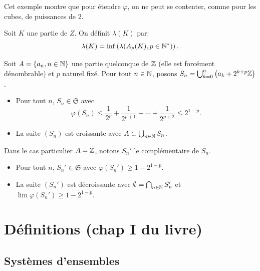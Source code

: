 Cet exemple montre que pour étendre $\varphi$, on ne peut se contenter, comme pour les cubes, de puissances de $2$.

\begin{defi}
 Soit $K$ une partie de $Z$. On définit $\lambda(K)$ par:
 \begin{displaymath}
  \lambda(K) = \inf\left( \lambda(A_p(K), p\in \mathbb{N}^*)\right).
 \end{displaymath}
\end{defi}

\begin{explen} \label{exple:SuiteUnionClassesCong}
Soit $A = \left\lbrace a_n, n \in\mathbb{N}\right\rbrace$ une partie quelconque de $\mathbb{Z}$ (elle est forcément dénombrable) et $p$ naturel fixé.\newline
Pour tout $n \in \mathbb{N}$, posons $S_n = \bigcup_{k =0}^n \left(a_k + 2^{k+p} \mathbb{Z}\right)$.
 \begin{itemize}
  \item Pour tout $n$, $S_n\in \mathfrak{S}$ avec
  \begin{displaymath}
    \varphi(S_n)\leq \frac{1}{2^p} + \frac{1}{2^{p+1}} + \cdots + \frac{1}{2^{p+2}} \leq 2^{1-p}.
  \end{displaymath}
  \item La suite $(S_n)$ est croissante avec $A \subset \bigcup_{n\in \mathbb{N}}S_n$.
 \end{itemize}
Dans le cas particulier $A=\mathbb{Z}$, notons $S_n'$ le complémentaire de $S_n$.
 \begin{itemize}
  \item Pour tout $n$, $S_n'\in \mathfrak{S}$ avec $\varphi(S_n')\geq 1- 2^{1-p}$.
  \item La suite $(S_n')$ est décroissante avec $\emptyset = \bigcap_{n\in \mathbb{N}}S'_n$ et $\lim \varphi(S_n')\geq 1- 2^{1-p}$.
 \end{itemize}
\end{explen}


\chapter{Définitions \small{(chap I du livre)}}\label{Chap:SystFoncEns}
\section{Systèmes d'ensembles}\label{Sec:SystEns}
